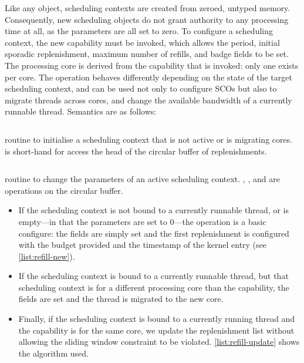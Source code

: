 Like any \selfour object, scheduling contexts are created from zeroed, untyped memory. Consequently,
new scheduling objects do not grant authority to any processing time at all, as the parameters are
all set to zero. To configure a scheduling context, the new \schedcontrol capability must be
invoked, which allows the period, initial sporadic replenishment, maximum number of refills, and
badge fields to be set. The processing core is derived from the \schedcontrol capability
that is invoked: only one exists per core. 
The \schedcontrolconfigure operation behaves differently depending on the state of the target scheduling
context, and can be used not only to configure \glspl{SCO} but also to migrate threads across cores, and
change the available bandwidth of a currently runnable thread. 
\clearpage
Semantics are as follows:

\begin{listing}[t]
    \inputminted{c}{code/refill_new.c}
    \caption[Refill new routine.]{ routine to initialise a scheduling context that is not active or is
    migrating cores.  is short-hand for access the head of the circular buffer of
    replenishments.}
    \label{list:refill-new}
    \inputminted{c}{code/refill_update.c}
    \caption[Refill update routine.]{ routine to change the parameters of an
            active scheduling context. , , and  are operations on 
            the circular buffer.}
\label{list:refill-update}
\end{listing}

\begin{itemize}
\item If the scheduling context is not bound
to a currently runnable thread, or is empty---in that the parameters are set to 0---the operation is 
a basic configure: the fields are
simply set and the first replenishment is configured with the budget provided and the timestamp of the
kernel entry (see \cref{list:refill-new}).
\item If the scheduling context is bound to a currently runnable thread, but that scheduling
context is for a different processing core than the \schedcontrol capability, the fields are
set and the thread is migrated to the new core.  
\item Finally, if the scheduling context is bound to a currently running thread and the
    \schedcontrol capability is for the same core, we update the replenishment list without
    allowing the sliding window constraint to be violated. \cref{list:refill-update} shows the
    algorithm used.
\end{itemize}

